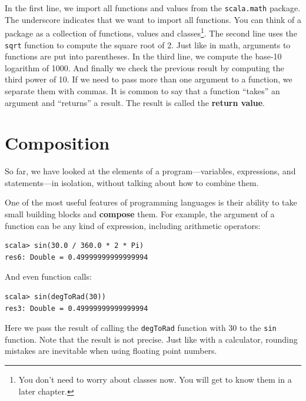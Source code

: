 \documentclass[10pt]{book}
\begin{document}

In the first line, we import all functions and values from the \verb#scala.math# package. The
underscore indicates that we want to import all functions. You can
think of a package as a collection of functions, values and classes\footnote{You don't need to
worry about classes now. You will get to know them in a later chapter.}. The
second line uses the \verb#sqrt# function to compute the square root of 2. Just like in math,
arguments to functions are put into parentheses. In the third line, we
compute the base-10 logarithm of 1000. And finally we check the previous result by computing the
third power of 10. If we need to pass more than one argument to a function, we separate them with
commas. It is common to say that a function ``takes'' an argument and
``returns'' a result. The result is called the {\bf return value}.


\section{Composition}

So far, we have looked at the elements of a program---variables,
expressions, and statements---in isolation, without talking about how to
combine them.

One of the most useful features of programming languages is their
ability to take small building blocks and {\bf compose} them.  For
example, the argument of a function can be any kind of expression,
including arithmetic operators:

\beforeverb
\begin{verbatim}
scala> sin(30.0 / 360.0 * 2 * Pi)
res6: Double = 0.49999999999999994
\end{verbatim}
\afterverb

And even function calls:

\beforeverb
\begin{verbatim}
scala> sin(degToRad(30))
res3: Double = 0.49999999999999994
\end{verbatim}
\afterverb

Here we pass the result of calling the \verb#degToRad# function with 30 to the \verb#sin# function.
Note that the result is not precise. Just like with a calculator, rounding mistakes are inevitable
when using floating point numbers.
\end{document}
